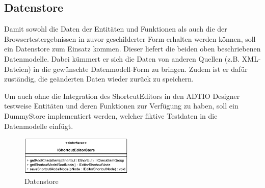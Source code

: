 \vspace{-5px}

\subsection{Datenstore}

Damit sowohl die Daten der Entitäten und Funktionen als auch die der Browsertestergebnissen in zuvor geschilderter Form erhalten werden können, soll ein Datenstore zum Einsatz kommen. Dieser liefert die beiden oben beschriebenen Datenmodelle. Dabei kümmert er sich die Daten von anderen Quellen (z.B. XML-Dateien) in die gewünschte Datenmodell-Form zu bringen. Zudem ist er dafür zuständig, die geänderten Daten wieder zurück zu speichern.

Um auch ohne die Integration des ShortcutEditors in den ADTIO Designer testweise Entitäten und deren Funktionen zur Verfügung zu haben, soll ein DummyStore implementiert werden, welcher fiktive Testdaten in die Datenmodelle einfügt.

\vfill

\begin{figure}[H]
	\centering
	\includegraphics[height=70px]{../graphic/diagrams/CD_IShortcutEditorStore/IShortcutEditorStore}
	\caption{Datenstore}
	\label{fig:ishortcuteditorstore}
\end{figure}



\newpage